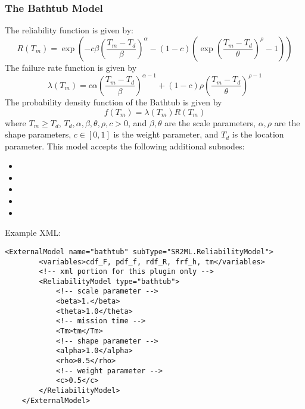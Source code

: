 \subsubsection{The Bathtub Model}
The reliability function is given by:
\begin{equation}
  R(T_m) = \exp\left(-c\beta\left(\frac{T_m-T_d}{\beta}\right)^\alpha -(1-c)\left(\exp\left(\frac{T_m-T_d}{\theta}\right)^\rho -1\right)\right)
\end{equation}
The failure rate function is given by
\begin{equation}
  \lambda(T_m) = c\alpha\left(\frac{T_m-T_d}{\beta}\right)^{\alpha-1}+(1-c)\rho\left(\frac{T_m-T_d}{\theta}\right)^{\rho-1}
\end{equation}
The probability density function of the Bathtub is given by
\begin{equation}
	f(T_m) = \lambda(T_m) R(T_m)
\end{equation}
where $T_m\geq T_d$, $T_d, \alpha, \beta, \theta, \rho, c >0$, and $\beta, \theta$ are the scale parameters,
$\alpha, \rho$ are the shape parameters, $c \in [0,1]$ is the weight parameter, and $T_d$ is the location parameter.
This model accepts the following additional subnodes:
\begin{itemize}
	\item {}
	\item {}
	\item {}
	\item {}
	\item {}
\end{itemize}

Example XML:
\begin{lstlisting}[style=XML]
	<ExternalModel name="bathtub" subType="SR2ML.ReliabilityModel">
		<variables>cdf_F, pdf_f, rdf_R, frf_h, tm</variables>
		<!-- xml portion for this plugin only -->
		<ReliabilityModel type="bathtub">
			<!-- scale parameter -->
			<beta>1.</beta>
			<theta>1.0</theta>
			<!-- mission time -->
			<Tm>tm</Tm>
			<!-- shape parameter -->
			<alpha>1.0</alpha>
			<rho>0.5</rho>
			<!-- weight parameter -->
			<c>0.5</c>
		</ReliabilityModel>
	</ExternalModel>
\end{lstlisting}


